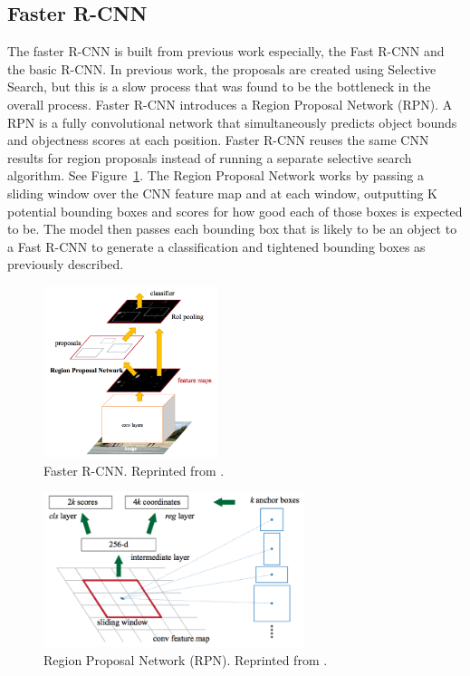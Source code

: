\subsection{Faster R-CNN}
The faster R-CNN \cite{ren2015faster} is built from previous work especially, the Fast R-CNN and the basic R-CNN. In previous work, the proposals are created using Selective Search, but this is a slow process that was found to be the bottleneck in the overall process. Faster R-CNN introduces a Region Proposal Network (RPN). A RPN is a fully convolutional network that simultaneously predicts object bounds and objectness scores at each position. Faster R-CNN reuses the same CNN results for region proposals instead of running a separate selective search algorithm. See Figure~\ref{fig:fasterrcnn}. The Region Proposal Network works by passing a sliding window over the CNN feature map and at each window, outputting K potential bounding boxes and scores for how good each of those boxes is expected to be. The model then passes each bounding box that is likely to be an object to a Fast R-CNN to generate a classification and tightened bounding boxes as previously described.

\begin{figure}[t]
	\centering
	\includegraphics[width=2in]{figures/fasterrcnn.jpg}  
	\caption[Faster R-CNN]{Faster R-CNN. Reprinted from . }
	\label{fig:fasterrcnn}
\end{figure}
\begin{figure}[t]
	\centering
	\includegraphics[width=3in]{figures/rpn.jpg}  
	\caption[Region Proposal Network (RPN)]{Region Proposal Network (RPN). Reprinted from . }
	\label{fig:rpn}
\end{figure}

